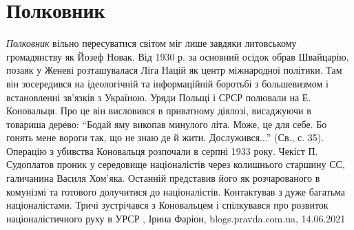  
 
 
 
 
\chapter{Полковник}

\emph{Полковник} вільно пересуватися світом міг лише завдяки литовському громадянству
як Йозеф Новак. Від 1930 р. за основний осідок обрав Швайцарію, позаяк у Женеві
розташувалася Ліга Націй як центр міжнародної політики. Там він зосередився на
ідеологічній та інформаційній боротьбі з большевизмом і встановленні зв'язків з
Україною. Уряди Польщі і СРСР полювали на Е. Коновальця. Про це він висловився
в приватному діялозі, висаджуючи в товариша дерево: \enquote{Бодай яму викопав минулого
літа. Може, це для себе. Бо гонять мене вороги так, що не знаю де й жити.
Дослужився...} (Св., с. 35).
Операцію з убивства Коновальця розпочали в серпні 1933 року. Чекіст П.
Судоплатов проник у середовище націоналістів через колишнього старшину СС,
галичанина Василя Хом'яка. Останній представив його як розчарованого в
комунізмі та готового долучитися до націоналістів. Контактував з дуже багатьма
націоналістами. Тричі зустрічався з Коновальцем і спілкувався про розвиток
націоналістичного руху в УРСР
, 
Ірина Фаріон, blogs.pravda.com.ua, 14.06.2021
